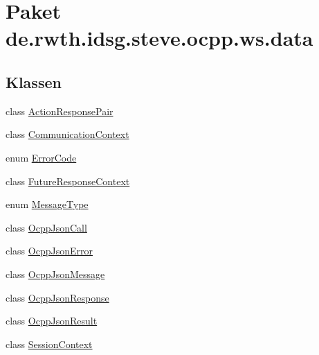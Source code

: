 \hypertarget{namespacede_1_1rwth_1_1idsg_1_1steve_1_1ocpp_1_1ws_1_1data}{\section{Paket de.\-rwth.\-idsg.\-steve.\-ocpp.\-ws.\-data}
\label{namespacede_1_1rwth_1_1idsg_1_1steve_1_1ocpp_1_1ws_1_1data}
}
\subsection*{Klassen}
\begin{DoxyCompactItemize}
\item 
class \hyperlink{classde_1_1rwth_1_1idsg_1_1steve_1_1ocpp_1_1ws_1_1data_1_1_action_response_pair}{Action\-Response\-Pair}
\item 
class \hyperlink{classde_1_1rwth_1_1idsg_1_1steve_1_1ocpp_1_1ws_1_1data_1_1_communication_context}{Communication\-Context}
\item 
enum \hyperlink{enumde_1_1rwth_1_1idsg_1_1steve_1_1ocpp_1_1ws_1_1data_1_1_error_code}{Error\-Code}
\item 
class \hyperlink{classde_1_1rwth_1_1idsg_1_1steve_1_1ocpp_1_1ws_1_1data_1_1_future_response_context}{Future\-Response\-Context}
\item 
enum \hyperlink{enumde_1_1rwth_1_1idsg_1_1steve_1_1ocpp_1_1ws_1_1data_1_1_message_type}{Message\-Type}
\item 
class \hyperlink{classde_1_1rwth_1_1idsg_1_1steve_1_1ocpp_1_1ws_1_1data_1_1_ocpp_json_call}{Ocpp\-Json\-Call}
\item 
class \hyperlink{classde_1_1rwth_1_1idsg_1_1steve_1_1ocpp_1_1ws_1_1data_1_1_ocpp_json_error}{Ocpp\-Json\-Error}
\item 
class \hyperlink{classde_1_1rwth_1_1idsg_1_1steve_1_1ocpp_1_1ws_1_1data_1_1_ocpp_json_message}{Ocpp\-Json\-Message}
\item 
class \hyperlink{classde_1_1rwth_1_1idsg_1_1steve_1_1ocpp_1_1ws_1_1data_1_1_ocpp_json_response}{Ocpp\-Json\-Response}
\item 
class \hyperlink{classde_1_1rwth_1_1idsg_1_1steve_1_1ocpp_1_1ws_1_1data_1_1_ocpp_json_result}{Ocpp\-Json\-Result}
\item 
class \hyperlink{classde_1_1rwth_1_1idsg_1_1steve_1_1ocpp_1_1ws_1_1data_1_1_session_context}{Session\-Context}
\end{DoxyCompactItemize}
